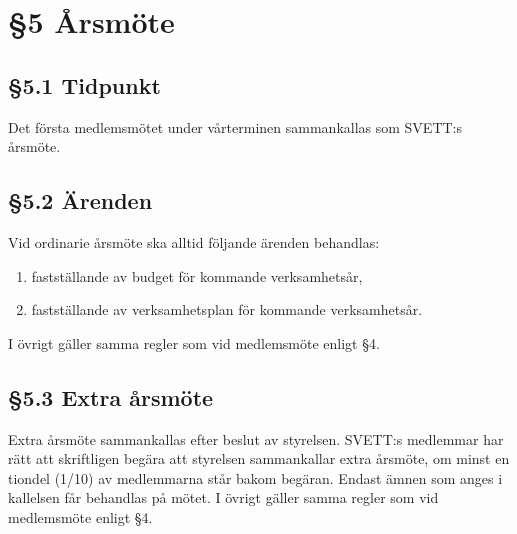 \section*{\S5 Årsmöte}

\subsection*{\S5.1 Tidpunkt}
{}

Det första medlemsmötet under vårterminen sammankallas som SVETT:s årsmöte.

\subsection*{\S5.2 Ärenden}

Vid ordinarie årsmöte ska alltid följande ärenden behandlas:
\begin{enumerate}[label=\roman*)]
	\item fastställande av budget för kommande verksamhetsår,
	\item fastställande av verksamhetsplan för kommande verksamhetsår.
\end{enumerate}

I övrigt gäller samma regler som vid medlemsmöte enligt \S4.

\subsection*{\S5.3 Extra årsmöte}

Extra årsmöte sammankallas efter beslut av styrelsen. SVETT:s medlemmar har rätt att
skriftligen begära att styrelsen sammankallar extra årsmöte, om minst en tiondel
(1/10) av medlemmarna står bakom begäran. Endast ämnen som anges i kallelsen får
behandlas på mötet. I övrigt gäller samma regler som vid medlemsmöte enligt \S4.
